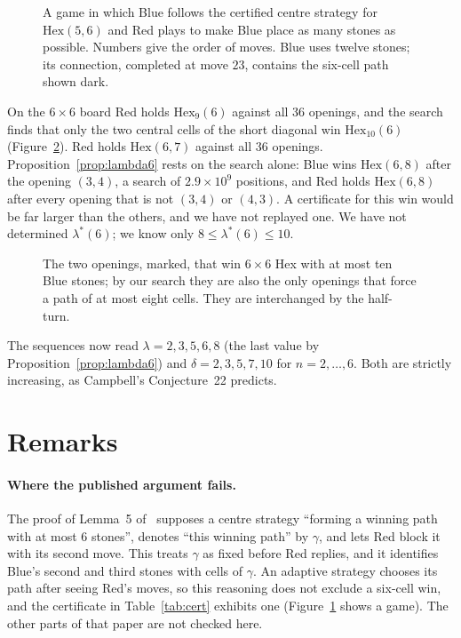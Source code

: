 \documentclass[11pt]{amsart}
\theoremstyle{definition}
\theoremstyle{remark}
\newcommand{\Hex}{\mathrm{Hex}}
\begin{document}
\begin{figure}[ht]
\centering

\caption{A game in which Blue follows the certified centre strategy for $\Hex(5,6)$ and Red plays to make Blue place as many stones as possible. Numbers give the order of moves. Blue uses twelve stones; its connection, completed at move $23$, contains the six-cell path shown dark.}
\label{fig:line5}
\end{figure}

On the $6\times6$ board Red holds $\Hex_9(6)$ against all $36$ openings, and the search finds that only the two central cells of the short diagonal win $\Hex_{10}(6)$ (Figure~\ref{fig:board6}). Red holds $\Hex(6,7)$ against all $36$ openings. Proposition~\ref{prop:lambda6} rests on the search alone: Blue wins $\Hex(6,8)$ after the opening $(3,4)$, a search of $2.9\times10^9$ positions, and Red holds $\Hex(6,8)$ after every opening that is not $(3,4)$ or $(4,3)$. A certificate for this win would be far larger than the others, and we have not replayed one. We have not determined $\lambda^{*}(6)$; we know only $8\le\lambda^{*}(6)\le10$.

\begin{figure}[ht]
\centering

\caption{The two openings, marked, that win $6\times6$ Hex with at most ten Blue stones; by our search they are also the only openings that force a path of at most eight cells. They are interchanged by the half-turn.}
\label{fig:board6}
\end{figure}

The sequences now read $\lambda=2,3,5,6,8$ (the last value by Proposition~\ref{prop:lambda6}) and $\delta=2,3,5,7,10$ for $n=2,\dots,6$. Both are strictly increasing, as Campbell's Conjecture~22 predicts.

\section{Remarks}

\paragraph{Where the published argument fails.} The proof of Lemma~5 of~\cite{CPS2026} supposes a centre strategy ``forming a winning path with at most 6 stones'', denotes ``this winning path'' by $\gamma$, and lets Red block it with its second move. This treats $\gamma$ as fixed before Red replies, and it identifies Blue's second and third stones with cells of $\gamma$. An adaptive strategy chooses its path after seeing Red's moves, so this reasoning does not exclude a six-cell win, and the certificate in Table~\ref{tab:cert} exhibits one (Figure~\ref{fig:line5} shows a game). The other parts of that paper are not checked here.
\end{document}
